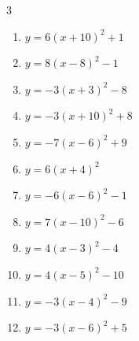 \begin{multicols}{3}
\begin{enumerate}
  \item $\displaystyle y=6\left( x+10\right)^{2}+1$

        \phantom{$\displaystyle 頂点\left( -10 , 1 \right)$}

  \item $\displaystyle y=8\left( x-8\right)^{2}-1$

        \phantom{$\displaystyle 頂点\left( 8 , -1 \right)$}

  \item $\displaystyle y=-3\left( x+3\right)^{2}-8$

        \phantom{$\displaystyle 頂点\left( -3 , -8 \right)$}

  \item $\displaystyle y=-3\left( x+10\right)^{2}+8$

        \phantom{$\displaystyle 頂点\left( -10 , 8 \right)$}

  \item $\displaystyle y=-7\left( x-6\right)^{2}+9$

        \phantom{$\displaystyle 頂点\left( 6 , 9 \right)$}

  \item $\displaystyle y=6\left( x+4\right)^{2}$

        \phantom{$\displaystyle 頂点\left( -4 , 0 \right)$}

  \item $\displaystyle y=-6\left( x-6\right)^{2}-1$

        \phantom{$\displaystyle 頂点\left( 6 , -1 \right)$}

  \item $\displaystyle y=7\left( x-10\right)^{2}-6$

        \phantom{$\displaystyle 頂点\left( 10 , -6 \right)$}

  \item $\displaystyle y=4\left( x-3\right)^{2}-4$

        \phantom{$\displaystyle 頂点\left( 3 , -4 \right)$}

  \item $\displaystyle y=4\left( x-5\right)^{2}-10$

        \phantom{$\displaystyle 頂点\left( 5 , -10 \right)$}

  \item $\displaystyle y=-3\left( x-4\right)^{2}-9$

        \phantom{$\displaystyle 頂点\left( 4 , -9 \right)$}

  \item $\displaystyle y=-3\left( x-6\right)^{2}+5$


\end{enumerate}
\end{multicols}
